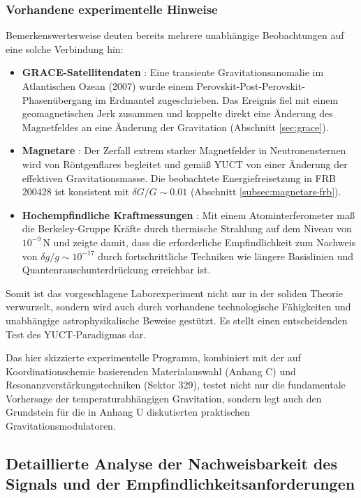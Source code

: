 \documentclass[12pt]{article}
\theoremstyle{remark}
\begin{document}
	\subsubsection{Vorhandene experimentelle Hinweise}
	Bemerkenswerterweise deuten bereits mehrere unabhängige Beobachtungen auf eine solche Verbindung hin:
	\begin{itemize}
		\item \textbf{GRACE-Satellitendaten} \cite{Rosat2025}: Eine transiente Gravitationsanomalie im Atlantischen Ozean (2007) wurde einem Perovskit-Post-Perovskit-Phasenübergang im Erdmantel zugeschrieben. Das Ereignis fiel mit einem geomagnetischen Jerk zusammen und koppelte direkt eine Änderung des Magnetfeldes an eine Änderung der Gravitation (Abschnitt \ref{sec:grace}).
		\item \textbf{Magnetare} \cite{Kaspi2017}: Der Zerfall extrem starker Magnetfelder in Neutronensternen wird von Röntgenflares begleitet und gemäß YUCT von einer Änderung der effektiven Gravitationsmasse. Die beobachtete Energiefreisetzung in FRB 200428 ist konsistent mit \(\delta G/G \sim 0.01\) (Abschnitt \ref{subsec:magnetars-frb}).
		\item \textbf{Hochempfindliche Kraftmessungen} \cite{Muller2017}: Mit einem Atominterferometer maß die Berkeley-Gruppe Kräfte durch thermische Strahlung auf dem Niveau von \(10^{-9}\,\mathrm{N}\) und zeigte damit, dass die erforderliche Empfindlichkeit zum Nachweis von \(\delta g/g \sim 10^{-17}\) durch fortschrittliche Techniken wie längere Basislinien und Quantenrauschunterdrückung erreichbar ist.
	\end{itemize}
	
	Somit ist das vorgeschlagene Laborexperiment nicht nur in der soliden Theorie verwurzelt, sondern wird auch durch vorhandene technologische Fähigkeiten und unabhängige astrophysikalische Beweise gestützt. Es stellt einen entscheidenden Test des YUCT-Paradigmas dar.
	
	Das hier skizzierte experimentelle Programm, kombiniert mit der auf Koordinationschemie basierenden Materialauswahl (Anhang C) und Resonanzverstärkungstechniken (Sektor 329), testet nicht nur die fundamentale Vorhersage der temperaturabhängigen Gravitation, sondern legt auch den Grundstein für die in Anhang U diskutierten praktischen Gravitationsmodulatoren.
	
	\subsection{Detaillierte Analyse der Nachweisbarkeit des Signals und der Empfindlichkeitsanforderungen}
	\label{subsec:signal-detectability}
	
\end{document}
